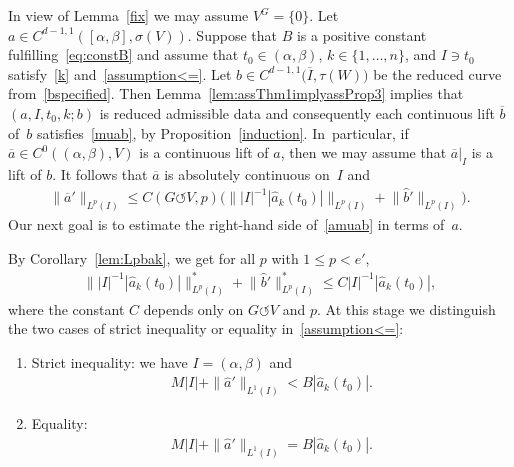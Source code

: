 \documentclass[pdftex]{sigma}
\numberwithin{equation}{section}
\def\al{\alpha}
\def\be{\beta}
\def\si{\sigma}
\def\ta{\tau}
\def\ol{\overline}
\def\const{M}
\def\we{\hat}
\def\acts{\circlearrowleft}
\begin{document}
In view of Lemma~\ref{fix} we may assume $V^G = \{0\}$.
Let $a \in C^{d-1,1}([\al,\be],\si(V))$. Suppose that $B$ is a positive constant fulfilling~\eqref{eq:constB} and
assume that
$t_0 \in (\al,\be)$, $k \in \{1,\dots,n\}$, and $I \ni t_0$
satis\-fy~\eqref{k} and~\eqref{assumption<=}.
Let $b \in C^{d-1,1}\big(\overline I, \ta(W)\big)$ be the reduced curve from~\eqref{bspecified}.
Then Lemma~\ref{lem:assThm1implyassProp3} implies that $(a,I,t_0,k;b)$ is reduced admissible data and
consequently each continuous lift $\ol b$ of~$b$ satisfies~\eqref{muab}, by Proposition~\ref{induction}. In~particular, if~$\ol a \in C^0((\al,\be),V)$ is a continuous lift of $a$, then we may assume
that $\ol a|_I$ is a lift of $b$.
It follows that $\ol a$ is absolutely continuous on~$I$ and
\begin{gather} \label{amuab}
 	\|\ol a'\|_{L^p(I)} \le C(G \acts V,p) \Big( \big\| |I|^{-1} {|\we a_k(t_0)|} \big\|_{L^p (I)}
 + \big\|\we b'\big\|_{L^p (I)}\Big).
 \end{gather}
Our next goal is to estimate the right-hand side of~\eqref{amuab} in terms of~$a$.

By Corollary~\ref{lem:Lpbak},
we get for all $p$ with $1 \le p < e'$,
\begin{gather} \label{beforecases}
 \big\||I|^{-1} |\we a_k (t_0)| \big\|^*_{L^p (I)} + \big\|\we b'\big\|^*_{L^p(I)}
 \le C |I|^{-1} |\we a_k (t_0)|,
\end{gather}
where the constant $C$ depends only on $G \acts V$ and $p$.
At this stage we distinguish the two cases of strict inequality or equality in~\eqref{assumption<=}:
\begin{enumerate}
 \item[$(i)$] Strict inequality: we have $I = (\al,\be)$ and
 \begin{gather}\label{assumption<}
 \const |I| + \|\we a'\|_{L^1 (I)} < B |\we a_k(t_0)|.
 \end{gather}
 \item[$(ii)$] Equality:
 \begin{gather}\label{assumption=}
 \const |I| + \|\we a'\|_{L^1 (I)} = B |\we a_k(t_0)|.
 \end{gather}
\end{enumerate}
\end{document}

